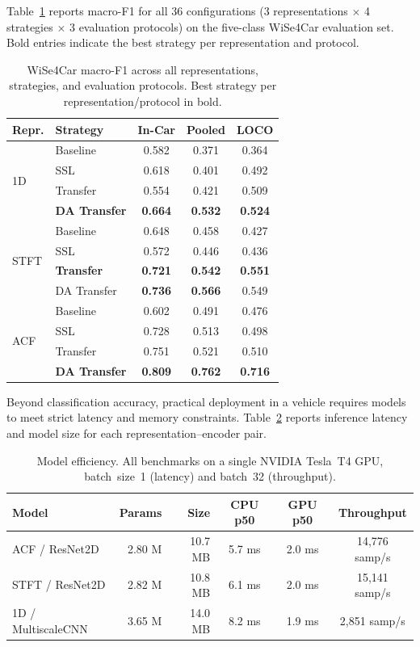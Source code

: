 \documentclass[english,bibtex]{kththesis}
\begin{document}
Table~\ref{tab:transfer_full} reports macro-F1 for all 36 configurations (3 representations $\times$ 4 strategies $\times$ 3 evaluation protocols) on the five-class WiSe4Car evaluation set. Bold entries indicate the best strategy per representation and protocol.

\begin{table}[!ht]
\caption{WiSe4Car macro-F1 across all representations, strategies, and evaluation protocols. Best strategy per representation/protocol in bold.}
\label{tab:transfer_full}
\centering
\small
\begin{tabular}{llccc}
\toprule
\textbf{Repr.} & \textbf{Strategy} & \textbf{In-Car} & \textbf{Pooled} & \textbf{LOCO} \\
\midrule
\multirow{4}{*}{1D}
  & Baseline    & 0.582 & 0.371 & 0.364 \\
  & SSL         & 0.618 & 0.401 & 0.492 \\
  & Transfer    & 0.554 & 0.421 & 0.509 \\
  & \textbf{DA Transfer} & \textbf{0.664} & \textbf{0.532} & \textbf{0.524} \\
\midrule
\multirow{4}{*}{STFT}
  & Baseline    & 0.648 & 0.458 & 0.427 \\
  & SSL         & 0.572 & 0.446 & 0.436 \\
  & \textbf{Transfer}    & \textbf{0.721} & \textbf{0.542} & \textbf{0.551} \\
  & DA Transfer & \textbf{0.736} & \textbf{0.566} & 0.549 \\
\midrule
\multirow{4}{*}{ACF}
  & Baseline    & 0.602 & 0.491 & 0.476 \\
  & SSL         & 0.728 & 0.513 & 0.498 \\
  & Transfer    & 0.751 & 0.521 & 0.510 \\
  & \textbf{DA Transfer} & \textbf{0.809} & \textbf{0.762} & \textbf{0.716} \\
\bottomrule
\end{tabular}
\end{table}

Beyond classification accuracy, practical deployment in a vehicle requires models to meet strict latency and memory constraints. Table~\ref{tab:efficiency} reports inference latency and model size for each representation–encoder pair.

\begin{table}[!ht]
\caption{Model efficiency. All benchmarks on a single NVIDIA Tesla~T4 GPU, batch~size~1 (latency) and batch~32 (throughput).}
\label{tab:efficiency}
\centering
\small
\begin{tabular}{lrrccc}
\toprule
\textbf{Model} & \textbf{Params} & \textbf{Size} & \textbf{CPU p50} & \textbf{GPU p50} & \textbf{Throughput} \\
\midrule
ACF / ResNet2D  & 2.80 M & 10.7 MB & 5.7 ms & 2.0 ms & 14{,}776 samp/s \\
STFT / ResNet2D     & 2.82 M & 10.8 MB & 6.1 ms & 2.0 ms & 15{,}141 samp/s \\
1D / MultiscaleCNN  & 3.65 M & 14.0 MB & 8.2 ms & 1.9 ms &  2{,}851 samp/s \\
\bottomrule
\end{tabular}
\end{table}
\end{document}
